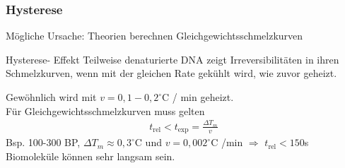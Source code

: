 \begin{frame}
\frametitle{Hysterese}
Mögliche Ursache: Theorien berechnen Gleichgewichtsschmelzkurven\\
\vspace{0.2cm}
\begin{block}{Hysterese- Effekt}
Teilweise denaturierte DNA zeigt Irreversibilitäten in ihren Schmelzkurven,
 wenn mit der gleichen Rate gekühlt wird, wie zuvor geheizt.
\end{block}
\vspace{0.2cm}
Gewöhnlich wird mit $v=0,1-0,2 ^\circ$C / min geheizt.\\
Für Gleichgewichtsschmelzkurven muss gelten 
\begin{align*}
t_{\text{rel}}<t_\text{exp}=\frac{\Delta T_m}{v}
\end{align*}
Bsp. 100-300 BP, $\Delta T_m\approx 0,3 ^\circ$C und  $v=0,002 ^\circ$C /min $\Rightarrow$ $t_{\text{rel}}<150$s\\
\vspace{0.3cm}
\centering Biomoleküle können sehr langsam sein.
\end{frame}




